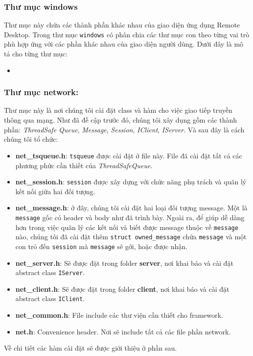\subsubsection{Thư mục windows}
Thư mục này chứa các thành phần khác nhau của giao diện ứng dụng Remote Desktop. Trong thư mục \verb|windows| có phân chia các thư mục con theo từng vai trò phù hợp ứng với các phần khác nhau của giao diện người dùng. Dưới đây là mô tả cho từng thư mục:
\begin{itemize}
	\item 
\end{itemize}	


\subsubsection{Thư mục network: }
Thư mục này là nơi chúng tôi cài đặt class và hàm cho việc giao tiếp truyền thông qua mạng. Như đã đề cập trước đó, chúng tôi xây dụng gồm các thành phần: \textit{ThreadSafe Queue}, \textit{Message}, \textit{Session}, \textit{IClient}, \textit{IServer}. Và sau đây là cách chúng tôi tổ chức: 
\begin{itemize}
	\item \textbf{net\_tsqueue.h}: \verb|tsqueue| được cài đặt ở file này. File đã cài đặt tất cả các phương phức cần thiết của \textit{ThreadSafeQueue}.
	 \item \textbf{net\_session.h}: \verb|session| được xây dựng với chức năng phụ trách và quãn lý kết nối giữa hai đối tượng.
	 \item \textbf{net\_message.h}: ở đây, chúng tôi cài đặt hai loại đối tượng message. Một là \verb|message| gốc có header và body như đã trình bày. Ngoài ra, để giúp dễ dàng hơn trong việc quãn lý các kết nối và biết được message thuộc về \verb|message| nào, chúng tôi đã cài đặt thêm \verb|struct owned_message| chứa \verb|message| và một con trỏ đến \verb|session| mà \verb|message| sẽ gởi, hoặc được nhận. 
	 \item \textbf{net\_server.h}: Sẽ được đặt trong folder \textbf{server}, nơi khai báo và cài đặt abstract class \verb|IServer|.
	 \item \textbf{net\_client.h}: Sẽ được đặt trong folder \textbf{client}, nơi khai báo và cài đặt abstract class \verb|IClient|. 
	 \item \textbf{net\_common.h}: File include các thư viện cần thiết cho framework.
	 \item \textbf{net.h}: Convenience header. Nơi sẽ include tất cả các file phần network. 
\end{itemize}

Về chi tiết các hàm cài đặt sẽ được giới thiệu ở phần sau.